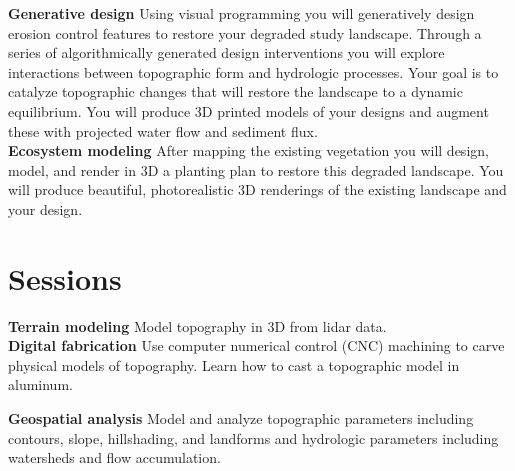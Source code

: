 \documentclass[11pt,article,oneside]{memoir}
\begin{document}

\noindent \textbf{Generative design}
Using visual programming you will generatively design
erosion control features to restore your degraded study landscape.
Through a series of algorithmically generated design interventions 
you will explore interactions between 
topographic form and hydrologic processes.
Your goal is to catalyze topographic changes that will 
restore the landscape to a dynamic equilibrium.  
You will produce 3D printed models of your designs
and augment these with projected water flow and sediment flux. \\

\noindent \textbf{Ecosystem modeling}
After mapping the existing vegetation 
you will design, model, and render in 3D
a planting plan to restore this degraded landscape. 
You will produce beautiful, photorealistic 3D renderings  
of the existing landscape and your design. \\


\section{Sessions}

\renewcommand*{\bibfont}{\footnotesize}

\noindent \textbf{Terrain modeling}
Model topography in 3D from lidar data.\\

\noindent \textbf{Digital fabrication}
Use computer numerical control (CNC) machining 
to carve physical models of topography. 
Learn how to cast a topographic model
in aluminum.
%
\nocite{*} \printbibliography[keyword=fabrication, heading=none]
\vspace*{0.5em}


\noindent \textbf{Geospatial analysis}
Model and analyze topographic parameters including 
contours, slope, hillshading, and landforms
and hydrologic parameters 
including watersheds and flow accumulation. \\
\end{document}
